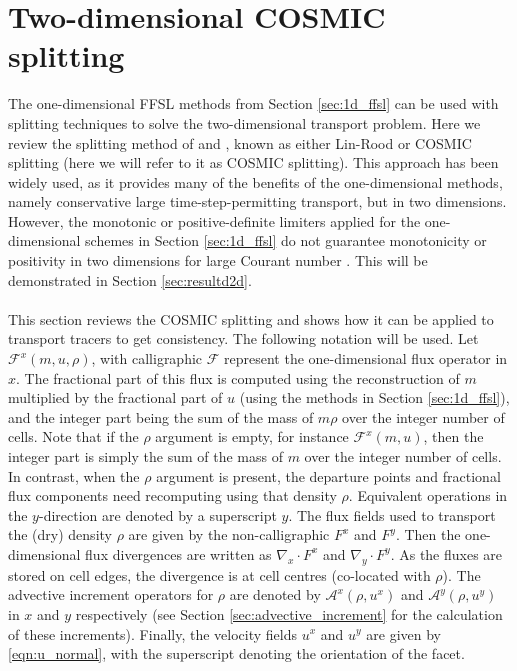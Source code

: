 \documentclass[11pt,a4paper]{article}
\begin{document}
\section{Two-dimensional COSMIC splitting} \label{sec:cosmic}

The one-dimensional FFSL methods from Section \ref{sec:1d_ffsl} can be used with splitting techniques to solve the two-dimensional transport problem. Here we review the splitting method of \citet{lin1996ffsl} and \citet{leonard1996cosmic}, known as either Lin-Rood or COSMIC splitting (here we will refer to it as COSMIC splitting). This approach has been widely used, as it provides many of the benefits of the one-dimensional methods, namely conservative large time-step-permitting transport, but in two dimensions. However, the monotonic or positive-definite limiters applied for the one-dimensional schemes in Section \ref{sec:1d_ffsl} do not guarantee monotonicity or positivity in two dimensions for large Courant number \citep{lin1996ffsl,leonard1996cosmic}.
This will be demonstrated in Section \ref{sec:resultd2d}. \\ 
\\
This section reviews the COSMIC splitting and shows how it can be applied to transport tracers to get consistency.
The following notation will be used. Let $\mathcal{F}^x(m,u,\rho)$, with calligraphic $\mathcal{F}$ represent the one-dimensional flux operator in $x$. 
The fractional part of this flux is computed using the reconstruction of $m$ multiplied by the fractional part of $u$ (using the methods in Section \ref{sec:1d_ffsl}), and the integer part being the sum of the mass of $m \rho$ over the integer number of cells.
Note that if the $\rho$ argument is empty, for instance $\mathcal{F}^x(m,u)$, then the integer part is simply the sum of the mass of $m$ over the integer number of cells.
In contrast, when the $\rho$ argument is present, the departure points and fractional flux components need recomputing using that density $\rho$.
Equivalent operations in the $y$-direction are denoted by a superscript $y$. 
The flux fields used to transport the (dry) density $\rho$ are given by the non-calligraphic $F^x$ and $F^y$.
Then the one-dimensional flux divergences are written as $\nabla_x\cdot F^x$ and $\nabla_y \cdot F^y$.
As the fluxes are stored on cell edges, the divergence is at cell centres (co-located with $\rho$).
The advective increment operators for $\rho$ are denoted by $\mathcal{A}^x(\rho,u^x)$ and $\mathcal{A}^y(\rho,u^y)$ in $x$ and $y$ respectively  (see Section \ref{sec:advective_increment} for the calculation of these increments).
Finally, the velocity fields $u^x$ and $u^y$ are given by \eqref{eqn:u_normal}, with the superscript denoting the orientation of the facet.
\end{document}
